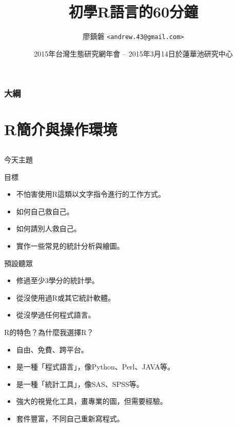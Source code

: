 \documentclass[14pt, aspectratio=43]{beamer}
\title{初學R語言的60分鐘}
\author{廖鎮磐 \texttt{<andrew.43@gmail.com>}}
\institute{東海大學生命科學系}
\date{2015年台灣生態研究網年會 -- 2015年3月14日於蓮華池研究中心}
\begin{document}
\xeCJKOffVerbAddon


\begin{frame}
\titlepage
\end{frame}

\begin{frame}
\frametitle{大綱}
\tableofcontents
\end{frame}

\section{R簡介與操作環境}\subsection{}

\begin{frame}{今天主題}

\begin{block}{目標}
\begin{itemize}
\item 不怕害使用R這類以文字指令進行的工作方式。
\item 如何自己救自己。
\item 如何請別人救自己。
\item 實作一些常見的統計分析與繪圖。
\end{itemize}
\end{block}

\begin{block}{預設聽眾}
\begin{itemize}
\item 修過至少3學分的統計學。
\item 從沒使用過R或其它統計軟體。
\item 從沒學過任何程式語言。
\end{itemize}
\end{block}

\end{frame}




\begin{frame}{R的特色？為什麼我選擇R？}
\begin{itemize}
\item 自由、免費、跨平台。
\item 是一種「程式語言」，像Python、Perl、JAVA等。
\item 是一種「統計工具」，像SAS、SPSS等。
\item 強大的視覺化工具，畫專業的圖，但需要經驗。
\item 套件豐富，不同自己重新寫程式。
\end{itemize}
\end{frame}
\end{document}
